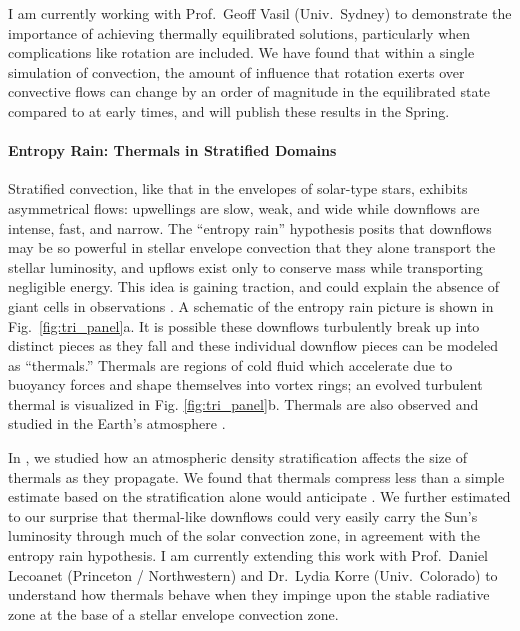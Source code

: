 \documentclass[onecolumn, hmargin=1in, vmargin=1in]{aastex62}
\begin{document}
I am currently working with Prof.~Geoff Vasil (Univ.~Sydney) to demonstrate the importance of achieving thermally equilibrated solutions, particularly when complications like rotation are included.
We have found that within a single simulation of convection, the amount of influence that rotation exerts over convective flows can change by an order of magnitude in the equilibrated state compared to at early times, and will publish these results in the Spring.

\paragraph{Entropy Rain: Thermals in Stratified Domains}
Stratified convection, like that in the envelopes of solar-type stars, exhibits asymmetrical flows: upwellings are slow, weak, and wide while downflows are intense, fast, and narrow.
The ``entropy rain'' hypothesis posits that downflows may be so powerful in stellar envelope convection that they alone transport the stellar luminosity, and upflows exist only to conserve mass while transporting negligible energy.
This idea is gaining traction, and could explain the absence of giant cells in observations \citep{hanasoge&all2015}.
A schematic of the entropy rain picture is shown in Fig.~\ref{fig:tri_panel}a.
It is possible these downflows turbulently break up into distinct pieces as they fall and these individual downflow pieces can be modeled as ``thermals.''
Thermals are regions of cold fluid which accelerate due to buoyancy forces and shape themselves into vortex rings; an evolved turbulent thermal is visualized in Fig. \ref{fig:tri_panel}b.
Thermals are also observed and studied in the Earth's atmosphere \citep{lecoanet&jeevanjee2019}.

In \citet{andersLB2019}, we studied how an atmospheric density stratification affects the size of thermals as they propagate.
We found that thermals compress less than a simple estimate based on the stratification alone would anticipate \citep{brandenburg2016}.
We further estimated to our surprise that thermal-like downflows could very easily carry the Sun's luminosity through much of the solar convection zone, in agreement with the entropy rain hypothesis.
I am currently extending this work with Prof.~Daniel Lecoanet (Princeton / Northwestern) and Dr.~Lydia Korre (Univ.~Colorado) to understand how thermals behave when they impinge upon the stable radiative zone at the base of a stellar envelope convection zone.
\end{document}
